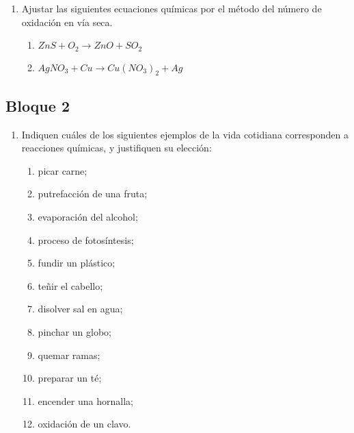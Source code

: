\documentclass[../Práctica.root.tex]{subfiles}
\newcommand{\lra}{\ensuremath{\longrightarrow{}}}
\begin{document}
\begin{enumerate}
    \item Ajustar las siguientes ecuaciones químicas por el método del número de oxidación en vía
          seca.
          \begin{enumerate}
              \item $ZnS + O_2 \lra ZnO + SO_2$
              \item $AgNO_3 + Cu \lra Cu(NO_3)_2 + Ag$
          \end{enumerate}
\end{enumerate}
\subsection{Bloque 2}
\begin{enumerate}
    \item Indiquen cuáles de los siguientes ejemplos de la vida cotidiana corresponden a reacciones
          químicas, y justifiquen su elección:
          \begin{enumerate}
              \item picar carne;
              \item putrefacción de una fruta;
              \item evaporación del alcohol;
              \item proceso de fotosíntesis;
              \item fundir un plástico;
              \item teñir el cabello;
              \item disolver sal en agua;
              \item pinchar un globo;
              \item quemar ramas;
              \item preparar un té;
              \item encender una hornalla;
              \item oxidación de un clavo.
          \end{enumerate}


\end{enumerate}
\end{document}
